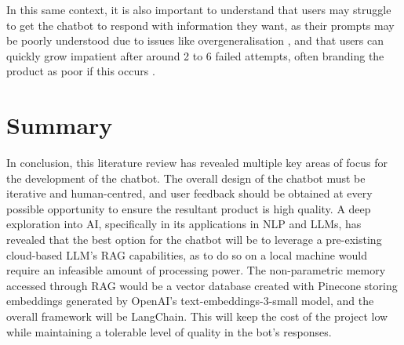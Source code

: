 \documentclass[12pt]{report}
\begin{document}
    In this same context, it is also important to understand that users may struggle
    to get the chatbot to respond with information they want, as their prompts may be poorly understood
    due to issues like overgeneralisation \autocite{zamfirescu-pereira_why_2023}, and that users can quickly 
    grow impatient after around 2 to 6 failed attempts, often branding the product as poor if this occurs \autocite{luger_like_2016}.


    \pagebreak 

    \section{Summary}

    In conclusion, this literature review has revealed multiple key areas of focus for the development of the 
    chatbot. The overall design of the chatbot must be iterative and human-centred, and user feedback should 
    be obtained at every possible opportunity to ensure the resultant product is high quality. A deep exploration 
    into AI, specifically in its applications in NLP and LLMs, has revealed that the best option for the chatbot 
    will be to leverage a pre-existing cloud-based LLM's RAG capabilities, as to do so on a local machine would require an infeasible amount of processing power.
    The non-parametric memory accessed through RAG would be a vector database created with Pinecone storing embeddings generated by OpenAI's text-embeddings-3-small 
    model, and the overall framework will be LangChain. This will keep the cost of the project low while maintaining a tolerable level of quality in the bot's responses.

\end{document}
